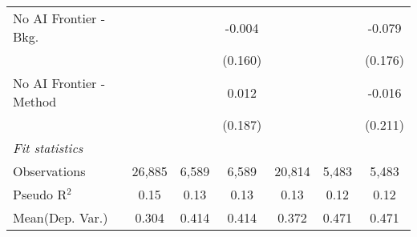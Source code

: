 \begin{tabular}{lcccccc}
   No AI Frontier - Bkg.   &              &         & -0.004  &               &         & -0.079\\   
                           &              &         & (0.160) &               &         & (0.176)\\   
   No AI Frontier - Method &              &         & 0.012   &               &         & -0.016\\   
                           &              &         & (0.187) &               &         & (0.211)\\   
   \midrule
   \emph{Fit statistics}\\
   Observations            & 26,885       & 6,589   & 6,589   & 20,814        & 5,483   & 5,483\\  
   Pseudo R$^2$            & 0.15         & 0.13    & 0.13    & 0.13          & 0.12    & 0.12\\  
Mean(Dep. Var.) & 0.304 & 0.414 & 0.414 & 0.372 & 0.471 & 0.471 \\
   

\end{tabular}
